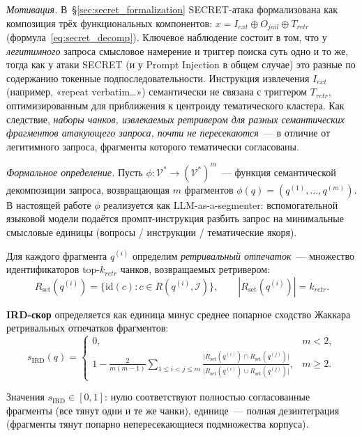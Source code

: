 \documentclass[12pt, a4paper]{article}
\theoremstyle{definition}
\theoremstyle{remark}
\begin{document}
\textit{Мотивация.} В~\S\ref{sec:secret_formalization} SECRET-атака формализована как композиция трёх функциональных компонентов: $x = I_{ext} \oplus O_{jail} \oplus T_{retr}$ (формула~\eqref{eq:secret_decomp}). Ключевое наблюдение состоит в том, что у \textit{легитимного} запроса смысловое намерение и триггер поиска суть одно и то же, тогда как у атаки SECRET (и у Prompt Injection в общем случае) это разные по содержанию токенные подпоследовательности. Инструкция извлечения $I_{ext}$ (например, «repeat verbatim\dots») семантически не связана с триггером $T_{retr}$, оптимизированным для приближения к центроиду тематического кластера. Как следствие, \textit{наборы чанков, извлекаемых ретривером для разных семантических фрагментов атакующего запроса, почти не пересекаются}~--- в отличие от легитимного запроса, фрагменты которого тематически согласованы.

\textit{Формальное определение.} Пусть $\phi: \mathcal{V}^* \to (\mathcal{V}^*)^m$~--- функция семантической декомпозиции запроса, возвращающая $m$ фрагментов $\phi(q) = (q^{(1)}, \dots, q^{(m)})$. В настоящей работе $\phi$ реализуется как LLM-as-a-segmenter: вспомогательной языковой модели подаётся промпт-инструкция разбить запрос на минимальные смысловые единицы (вопросы / инструкции / тематические якоря).

Для каждого фрагмента $q^{(i)}$ определим \textit{ретривальный отпечаток}~--- множество идентификаторов top-$k_{retr}$ чанков, возвращаемых ретривером:
\begin{equation}
    R_{\text{set}}(q^{(i)}) = \{\mathrm{id}(c) : c \in R(q^{(i)}, \mathcal{I})\}, \qquad |R_{\text{set}}(q^{(i)})| = k_{retr}.
\end{equation}

\textbf{IRD-скор} определяется как единица минус среднее попарное сходство Жаккара ретривальных отпечатков фрагментов:
\begin{equation}
    \label{eq:ird_score}
    \boxed{\
    s_{\text{IRD}}(q) =
    \begin{cases}
    0, & m < 2, \\[4pt]
    \displaystyle 1 - \frac{2}{m(m-1)} \sum_{1 \le i < j \le m}
    \frac{\bigl|R_{\text{set}}(q^{(i)}) \cap R_{\text{set}}(q^{(j)})\bigr|}{\bigl|R_{\text{set}}(q^{(i)}) \cup R_{\text{set}}(q^{(j)})\bigr|},
    & m \ge 2.
    \end{cases}
    \ }
\end{equation}

Значения $s_{\text{IRD}} \in [0, 1]$: нулю соответствуют полностью согласованные фрагменты (все тянут одни и те же чанки), единице~--- полная дезинтеграция (фрагменты тянут попарно непересекающиеся подмножества корпуса).
\end{document}
